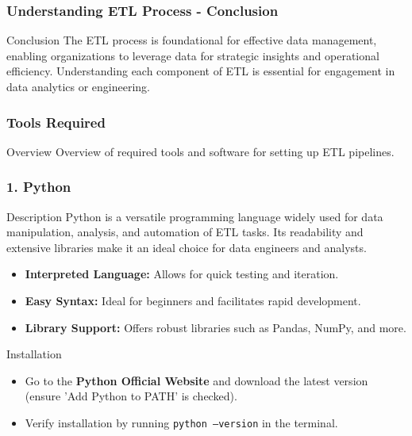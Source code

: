 \documentclass[aspectratio=169]{beamer}
\begin{document}
\begin{frame}[fragile]
    \frametitle{Understanding ETL Process - Conclusion}
    \begin{block}{Conclusion}
        The ETL process is foundational for effective data management, enabling organizations to leverage data for strategic insights and operational efficiency. Understanding each component of ETL is essential for engagement in data analytics or engineering.
    \end{block}
\end{frame}

\begin{frame}[fragile]
    \frametitle{Tools Required}
    \begin{block}{Overview}
        Overview of required tools and software for setting up ETL pipelines.
    \end{block}
\end{frame}

\begin{frame}[fragile]
    \frametitle{1. Python}
    \begin{block}{Description}
        Python is a versatile programming language widely used for data manipulation, analysis, and automation of ETL tasks. Its readability and extensive libraries make it an ideal choice for data engineers and analysts.
    \end{block}
    
    \begin{itemize}
        \item \textbf{Interpreted Language:} Allows for quick testing and iteration.
        \item \textbf{Easy Syntax:} Ideal for beginners and facilitates rapid development.
        \item \textbf{Library Support:} Offers robust libraries such as Pandas, NumPy, and more.
    \end{itemize} 

    \begin{block}{Installation}
        \begin{itemize}
            \item Go to the \textbf{Python Official Website} and download the latest version (ensure 'Add Python to PATH' is checked).
            \item Verify installation by running \texttt{python --version} in the terminal.
        \end{itemize}
    \end{block}
\end{frame}
\end{document}
